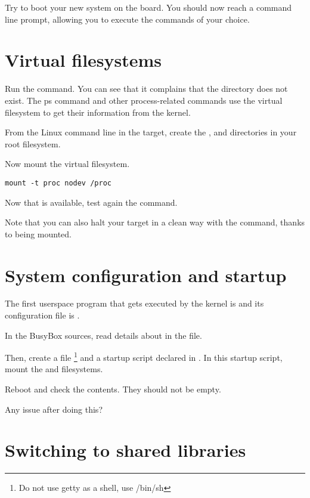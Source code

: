 Try to boot your new system on the board. You should now reach a 
command line prompt, allowing you to execute the commands of your
choice.

\section{Virtual filesystems}

Run the  command. You can see that it complains that the
 directory does not exist. The ps command and other
process-related commands use the  virtual filesystem to get
their information from the kernel.

From the Linux command line in the target, create the ,  and
 directories in your root filesystem.

Now mount the  virtual filesystem.

\begin{verbatim}
mount -t proc nodev /proc
\end{verbatim}

 Now that  is
available, test again the  command.

Note that you can also halt your target in a clean way with the 
command, thanks to  being mounted.

\section{System configuration and startup}

The first userspace program that gets executed by the kernel is
 and its configuration file is .

In the BusyBox sources, read details about  in the
 file.

Then, create a  file \footnote{Do not use getty as a shell, use /bin/sh}
and a  startup script declared in . In this startup
script, mount the  and  filesystems.


Reboot and check the contents. They should not be empty.


Any issue after doing this?

\section{Switching to shared libraries}

